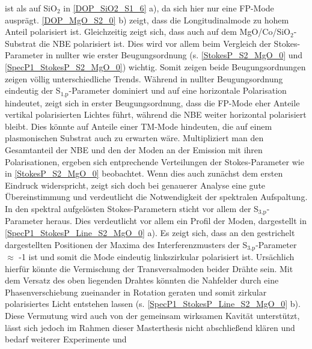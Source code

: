 ist als auf SiO$_\text{2}$ in \autoref{DOP_SiO2_S1_6} a), da sich hier nur eine
FP-Mode ausprägt. \autoref{DOP_MgO_S2_0} b) zeigt, dass die Longitudinalmode zu
hohem Anteil polarisiert ist. Gleichzeitig zeigt sich, dass auch auf dem
MgO/Co/SiO$_\text{2}$-Substrat die NBE polarisiert ist. Dies wird vor allem beim
Vergleich der Stokes-Parameter in nullter wie erster Beugungsordnung (s.
\autoref{StokesP_S2_MgO_0} und \autoref{SpecP1_StokesP_S2_MgO_0}) wichtig. Somit
zeigen beide Beugungsordnungen zeigen völlig unterschiedliche Trends. Während in
nullter Beugungsordnung eindeutig der S$_\text{1,p}$-Parameter dominiert und auf
eine horizontale Polarisation hindeutet, zeigt sich in erster Beugungsordnung,
dass die FP-Mode eher Anteile vertikal polarisierten Lichtes führt, während die
NBE weiter horizontal polarisiert bleibt. Dies könnte auf Anteile einer TM-Mode
hindeuten, die auf einem plasmonischen Substrat auch zu erwarten wäre.
Multipliziert man den Gesamtanteil der NBE  und den der Moden an der Emission
mit ihren Polarisationen, ergeben sich entprechende Verteilungen der
Stokes-Parameter wie in \autoref{StokesP_S2_MgO_0} beobachtet. Wenn dies auch
zunächst dem ersten Eindruck widerspricht, zeigt sich doch bei genauerer Analyse
eine gute Übereinstimmung und verdeutlicht die Notwendigkeit der spektralen
Aufspaltung.\\ In den spektral aufgelösten Stokes-Parametern sticht vor allem
der S$_\text{3,p}$-Parameter heraus. Dies verdeutlicht vor allem ein Profil der
Moden, dargestellt in \autoref{SpecP1_StokesP_Line_S2_MgO_0} a). Es zeigt sich,
dass an den gestrichelt dargestellten Positionen der Maxima des
Interferenzmusters der S$_\text{3,p}$-Parameter $\approx$ -1 ist und somit die
Mode eindeutig linkszirkular polarisiert ist. Ursächlich hierfür könnte die
Vermischung der Transversalmoden beider Drähte sein. Mit dem Versatz des oben
liegenden Drahtes könnten die Nahfelder durch eine Phasenverschiebung zueinander
in Rotation geraten und somit zirkular polarisiertes Licht entstehen lassen (s.
\autoref{SpecP1_StokesP_Line_S2_MgO_0} b). Diese Vermutung wird auch von der
gemeinsam wirksamen Kavität unterstützt, lässt sich jedoch im Rahmen dieser
Masterthesis nicht abschließend klären und bedarf weiterer Experimente und
